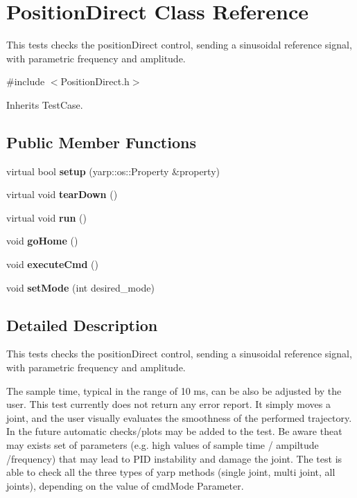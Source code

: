 \section{Position\+Direct Class Reference}
\label{classPositionDirect}


This tests checks the position\+Direct control, sending a sinusoidal reference signal, with parametric frequency and amplitude.  




{\ttfamily \#include $<$Position\+Direct.\+h$>$}



Inherits Test\+Case.

\subsection*{Public Member Functions}
\begin{DoxyCompactItemize}
\item 
\mbox{\label{classPositionDirect_a65b1833e16c9185db0d488248e59d7cc}} 
virtual bool {\bfseries setup} (yarp\+::os\+::\+Property \&property)
\item 
\mbox{\label{classPositionDirect_a84243f0cd8e5269d486899febfc47cca}} 
virtual void {\bfseries tear\+Down} ()
\item 
\mbox{\label{classPositionDirect_a70210708c01218e1aabbc657a16d85f4}} 
virtual void {\bfseries run} ()
\item 
\mbox{\label{classPositionDirect_a2dd8350755621895f0bb36d176d65e4e}} 
void {\bfseries go\+Home} ()
\item 
\mbox{\label{classPositionDirect_aa6f6d0aafdb7e339fa07bbc5232b4dfb}} 
void {\bfseries execute\+Cmd} ()
\item 
\mbox{\label{classPositionDirect_aa18a4e2b7558adf62e72873a78fed7bd}} 
void {\bfseries set\+Mode} (int desired\+\_\+mode)
\end{DoxyCompactItemize}


\subsection{Detailed Description}
This tests checks the position\+Direct control, sending a sinusoidal reference signal, with parametric frequency and amplitude. 

The sample time, typical in the range of 10 ms, can be also be adjusted by the user. This test currently does not return any error report. It simply moves a joint, and the user visually evaluates the smoothness of the performed trajectory. In the future automatic checks/plots may be added to the test. Be aware theat may exists set of parameters (e.\+g. high values of sample time / ampiltude /frequency) that may lead to P\+ID instability and damage the joint. The test is able to check all the three types of yarp methods (single joint, multi joint, all joints), depending on the value of cmd\+Mode Parameter.

